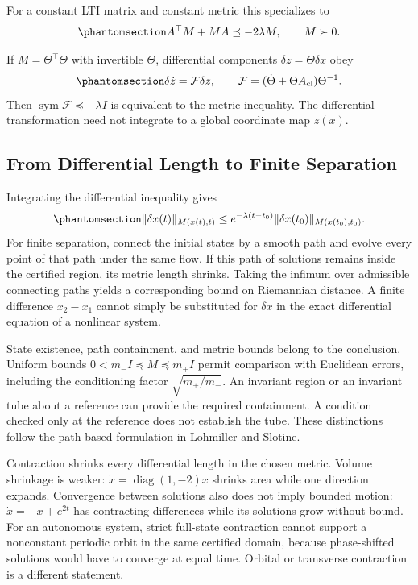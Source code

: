 \documentclass[
  10pt,
  letterpaper,
  DIV=11,
  numbers=noendperiod]{scrartcl}
\begin{document}
For a constant LTI matrix and constant metric this specializes to
\begin{equation}\phantomsection\label{eq-linear-contraction}{
A^\top M+MA\preceq-2\lambda M,\qquad M\succ0.
}\end{equation}

If \(M=\Theta^\top\Theta\) with invertible \(\Theta\), differential
components \(\delta z=\Theta\delta x\) obey
\begin{equation}\phantomsection\label{eq-ctu-generalized-jacobian-def}{
\delta\dot z=\mathcal F\delta z,\qquad
\mathcal F=(\dot\Theta+\Theta A_{\mathrm{cl}})\Theta^{-1}.
}\end{equation} Then \(\operatorname{sym}\mathcal F\preceq-\lambda I\)
is equivalent to the metric inequality. The differential transformation
need not integrate to a global coordinate map \(z(x)\).

\subsection{From Differential Length to Finite
Separation}\label{from-differential-length-to-finite-separation}

Integrating the differential inequality gives
\begin{equation}\phantomsection\label{eq-exponential-convergence}{
\|\delta x(t)\|_{M(x(t),t)}
\leq e^{-\lambda(t-t_0)}\|\delta x(t_0)\|_{M(x(t_0),t_0)}.
}\end{equation} For finite separation, connect the initial states by a
smooth path and evolve every point of that path under the same flow. If
this path of solutions remains inside the certified region, its metric
length shrinks. Taking the infimum over admissible connecting paths
yields a corresponding bound on Riemannian distance. A finite difference
\(x_2-x_1\) cannot simply be substituted for \(\delta x\) in the exact
differential equation of a nonlinear system.

State existence, path containment, and metric bounds belong to the
conclusion. Uniform bounds \(0<m_-I\preceq M\preceq m_+I\) permit
comparison with Euclidean errors, including the conditioning factor
\(\sqrt{m_+/m_-}\). An invariant region or an invariant tube about a
reference can provide the required containment. A condition checked only
at the reference does not establish the tube. These distinctions follow
the path-based formulation in
\href{https://web.mit.edu/nsl/www/preprints/contraction.pdf}{Lohmiller
and Slotine}.

Contraction shrinks every differential length in the chosen metric.
Volume shrinkage is weaker: \(\dot x=\operatorname{diag}(1,-2)x\)
shrinks area while one direction expands. Convergence between solutions
also does not imply bounded motion: \(\dot x=-x+e^{2t}\) has contracting
differences while its solutions grow without bound. For an autonomous
system, strict full-state contraction cannot support a nonconstant
periodic orbit in the same certified domain, because phase-shifted
solutions would have to converge at equal time. Orbital or transverse
contraction is a different statement.
\end{document}
